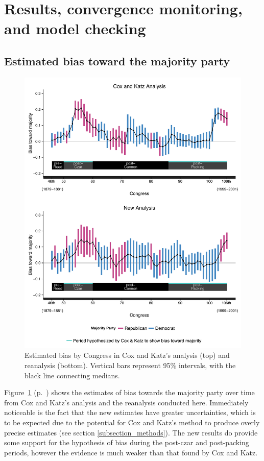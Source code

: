 \section{Results, convergence monitoring, and model checking}


\subsection{Estimated bias toward the majority party}
\label{results}

\begin{figure}
\centering
\includegraphics[scale=0.75]{sections/figs/ck_replication}
\caption{Estimated bias by Congress in Cox and Katz's analysis (top) and reanalysis (bottom). Vertical bars represent 95\%  intervals, with the black line connecting medians.}
\label{fig:ck_bias}
\end{figure}

Figure~\ref{fig:ck_bias} (p.~\pageref{fig:ck_bias}) shows the estimates of bias towards the majority party over time from Cox and Katz's analysis and the reanalysis conducted here. Immediately noticeable is the fact that the new estimates have greater uncertainties, which is to be expected due to the potential for Cox and Katz's method to produce overly precise estimates  (see section \ref{subsection_methods}). The new results do provide some support for the hypothesis of bias during the post-czar and post-packing periods, however the evidence is much weaker than that found by Cox and Katz. 

